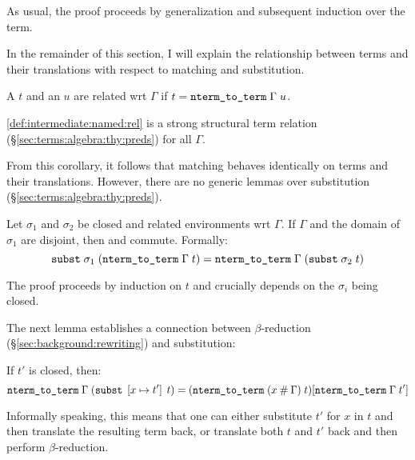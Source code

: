 \noindent
As usual, the proof proceeds by generalization and subsequent induction over the term.

In the remainder of this section, I will explain the relationship between terms and their translations with respect to matching and substitution.

\begin{definition}\label{def:intermediate:named:rel}
  A  $t$ and an  $u$ are related wrt $\Gamma$ if $t = \texttt{\textup{nterm\_to\_term}}\;\Gamma\;u$.
\end{definition}

\begin{corollary}\label{thm:intermediate:named:rel}
  \cref{def:intermediate:named:rel} is a strong structural term relation (§\ref{sec:terms:algebra:thy:preds}) for all $\Gamma$.
\end{corollary}

\noindent
From this corollary, it follows that matching behaves identically on terms and their translations.
However, there are no generic lemmas over substitution (§\ref{sec:terms:algebra:thy:preds}).

\begin{lemma}\label{thm:intermediate:named:subst}
  Let $\sigma_1$ and $\sigma_2$ be closed and related environments wrt $\Gamma$.
  If $\Gamma$ and the domain of $\sigma_1$ are disjoint, then  and  commute.
  Formally:
  \[ \texttt{\textup{subst}}\;\sigma_1\;(\texttt{\textup{nterm\_to\_term}}\;\Gamma\;t) = \texttt{\textup{nterm\_to\_term}}\;\Gamma\;(\texttt{\textup{subst}}\;\sigma_2\;t) \]
\end{lemma}

\noindent
The proof proceeds by induction on $t$ and crucially depends on the $\sigma_i$ being closed.

The next lemma establishes a connection between $\beta$-reduction (§\ref{sec:background:rewriting}) and substitution:

\begin{lemma}\label{thm:intermediate:named:beta}
  If $t'$ is closed, then:
  \[
    \texttt{\textup{nterm\_to\_term}}\;\Gamma\;(\texttt{\textup{subst}}\;\left[x \mapsto t'\right]\;t) =
    (\texttt{\textup{nterm\_to\_term}}\;(x \mathbin{\mathtt{\#}} \Gamma)\;t) [\texttt{\textup{nterm\_to\_term}}\;\Gamma\;t']
  \]
\end{lemma}

\noindent
Informally speaking, this means that one can either substitute $t'$ for $x$ in $t$ and then translate the resulting term back, or translate both $t$ and $t'$ back and then perform $\beta$-reduction.

